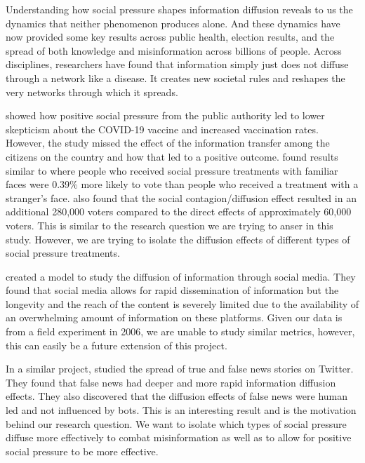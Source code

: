 \documentclass[11pt, draft]{article}
\begin{document}
Understanding how social pressure shapes information diffusion reveals to us the dynamics that neither phenomenon produces alone. And these dynamics have now provided some key results across public health, election results, and the spread of both knowledge and misinformation across billions of people. Across disciplines, researchers have found that information simply just does not diffuse through a network like a disease. It creates new societal rules and reshapes the very networks through which it spreads. 

\cite{hong_covid-19_2023} showed how positive social pressure from the public authority led to lower skepticism about the COVID-19 vaccine and increased vaccination rates. However, the study missed the effect of the information transfer among the citizens on the country and how that led to a positive outcome. \cite{bond_61-million-person_2012} found results similar to \cite{gerber_social_2008} where people who received social pressure treatments with familiar faces were 0.39\% more likely to vote than people who received a treatment with a stranger's face. \cite{bond_61-million-person_2012} also found that the social contagion/diffusion effect resulted in an additional 280,000 voters compared to the direct effects of approximately 60,000 voters. This is similar to the research question we are trying to anser in this study. However, we are trying to isolate the diffusion effects of different types of social pressure treatments.

\cite{atienza-barthelemy_modeling_2025} created a model to study the diffusion of information through social media. They found that social media allows for rapid dissemination of information but the longevity and the reach of the content is severely limited due to the availability of an overwhelming amount of information on these platforms. Given our data is from a field experiment in 2006, we are unable to study similar metrics, however, this can easily be a future extension of this project.

In a similar project, \cite{vosoughi_spread_2018} studied the spread of true and false news stories on Twitter. They found that false news had deeper and more rapid information diffusion effects. They also discovered that the diffusion effects of false news were human led and not influenced by bots. This is an interesting result and is the motivation behind our research question. We want to isolate which types of social pressure diffuse more effectively to combat misinformation as well as to allow for positive social pressure to be more effective. 
\end{document}
